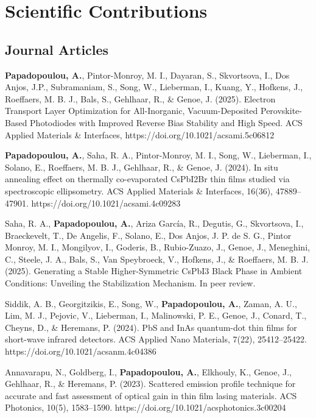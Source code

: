 \chapter{Scientific Contributions}\label{ch:publications}

\section*{Journal Articles}

\textbf{Papadopoulou, A.}, Pintor-Monroy, M. I., Dayaran, S., Skvortsova, I., Dos Anjos, J.P., Subramaniam, S., Song, W., Lieberman, I., Kuang, Y., Hofkens, J., Roeffaers, M. B. J., Bals, S., Gehlhaar, R., \& Genoe, J. (2025). Electron Transport Layer Optimization for All-Inorganic, Vacuum-Deposited Perovskite-Based Photodiodes with Improved Reverse Bias Stability and High Speed. ACS Applied Materials \& Interfaces, https://doi.org/10.1021/acsami.5c06812 

\textbf{Papadopoulou, A.}, Saha, R. A., Pintor-Monroy, M. I., Song, W., Lieberman, I., Solano, E., Roeffaers, M. B. J., Gehlhaar, R., \& Genoe, J. (2024). In situ annealing effect on thermally co-evaporated CsPbI2Br thin films studied via spectroscopic ellipsometry. ACS Applied Materials \& Interfaces, 16(36), 47889–47901. https://doi.org/10.1021/acsami.4c09283

Saha, R. A., \textbf{Papadopoulou, A.}, Ariza García, R., Degutis, G., Skvortsova, I., Braeckevelt, T., De Angelis, F., Solano, E., Dos Anjos, J. P. de S. G., Pintor Monroy, M. I., Mongilyov, I., Goderis, B., Rubio-Zuazo, J., Genoe, J., Meneghini, C., Steele, J. A., Bals, S., Van Speybroeck, V., Hofkens, J., \& Roeffaers, M. B. J. (2025). Generating a Stable Higher-Symmetric CsPbI3 Black Phase in Ambient Conditions: Unveiling the Stabilization Mechanism. In peer review.

Siddik, A. B., Georgitzikis, E., Song, W., \textbf{Papadopoulou, A.}, Zaman, A. U., Lim, M. J., Pejovic, V., Lieberman, I., Malinowski, P. E., Genoe, J., Conard, T., Cheyns, D., \& Heremans, P. (2024). PbS and InAs quantum-dot thin films for short-wave infrared detectors. ACS Applied Nano Materials, 7(22), 25412–25422. https://doi.org/10.1021/acsanm.4c04386

Annavarapu, N., Goldberg, I., \textbf{Papadopoulou, A.}, Elkhouly, K., Genoe, J., Gehlhaar, R., \& Heremans, P. (2023). Scattered emission profile technique for accurate and fast assessment of optical gain in thin film lasing materials. ACS Photonics, 10(5), 1583–1590. https://doi.org/10.1021/acsphotonics.3c00204


